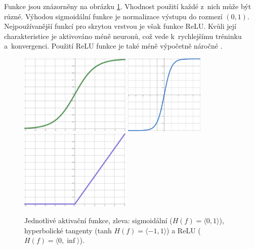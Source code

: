 Funkce jsou znázorněny na obrázku \ref{aktivacni_funkce}. Vhodnost použití každé z~nich může být různé. Výhodou sigmoidální funkce je normalizace výstupu do rozmezí $(0,1)$. Nejpoužívanější funkcí pro skrytou vrstvou je však funkce ReLU. Kvůli její charakteristice je aktivováno méně neuronů, což vede k~rychlejšímu tréninku a~konvergenci. Použití ReLU funkce je také méně výpočetně náročné \cite{medium:activation_function}.

\begin{figure}[hbt]
    \centering
	    \includegraphics[width=0.33\linewidth, height=1.5in]{obrazky/sigmoid.pdf}\hfill
    	\includegraphics[width=0.33\linewidth, height=1.5in]{obrazky/tanh.pdf}\hfill
    	\includegraphics[width=0.33\linewidth, height=1.5in]{obrazky/relu.pdf}\hfill
	\caption{Jednotlivé aktivační funkce, zleva: sigmoidální ($H(f)=\langle 0,1 \rangle$), hyperbolické tangenty (tanh $H(f)=\langle -1,1 \rangle$) a ReLU ($H(f)=\langle 0,\inf \rangle$).}
	\label{aktivacni_funkce}
\end{figure}


